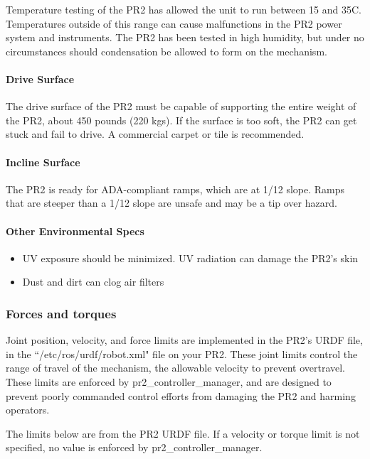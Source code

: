 Temperature testing of the PR2 has allowed the unit to run between 15 and
35C. Temperatures outside of this range can cause malfunctions in the PR2 power
system and instruments. The PR2 has been tested in high humidity, but under no
circumstances should condensation be allowed to form on the mechanism.

\paragraph{Drive Surface}

The drive surface of the PR2 must be capable of supporting the entire weight of
the PR2, about 450 pounds (220 kgs). If the surface is too soft, the PR2 can get
stuck and fail to drive. A commercial carpet or tile is recommended.

\paragraph{Incline Surface}

The PR2 is ready for ADA-compliant ramps, which are at 1/12 slope. Ramps that
are steeper than a 1/12 slope are unsafe and may be a tip over hazard.

\paragraph{Other Environmental Specs}

\begin{itemize}
\item UV exposure should be minimized. UV radiation can damage the PR2's skin
\item Dust and dirt can clog air filters
\end{itemize}

\subsubsection{Forces and torques}

Joint position, velocity, and force limits are implemented in the PR2's URDF
file, in the ``/etc/ros/urdf/robot.xml" file on your PR2. These joint limits
control the range of travel of the mechanism, the allowable velocity to prevent
overtravel. These limits are enforced by pr2\_controller\_manager, and are
designed to prevent poorly commanded control efforts from damaging the PR2 and
harming operators.

The limits below are from the PR2 URDF file. If a velocity or torque limit is
not specified, no value is enforced by pr2\_controller\_manager.

